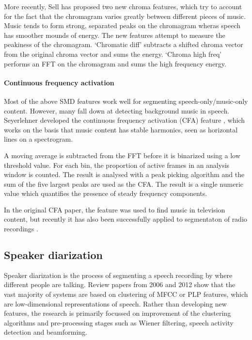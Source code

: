 More recently, Sell \citep{Sell2014} has proposed two new chroma features, which
try to account for the fact that the chromagram varies greatly between
different pieces of music. Music tends to form strong, separated peaks on the
chromagram wheras speech has smoother mounds of energy. The new features
attempt to measure the peakiness of the chromagram. `Chromatic diff' subtracts
a shifted chroma vector from the original chroma vector and sums the energy. 
`Chroma high freq' performs an FFT on the chromagram and sums the high
frequency energy.

\paragraph{Continuous frequency activation}
Most of the above SMD features work well for segmenting speech-only/music-only
content. However, many fall down at detecting background music in speech.
Seyerlehner developed the continuous frequency activation (CFA) feature
\citep{Seyerlehner2007}, which works on the basis that music content has stable
harmonics, seen as horizontal lines on a spectrogram.

A moving average is subtracted from the FFT before it is binarized using a low
threshold value. For each bin, the proportion of active frames in an analysis
window is counted. The result is analysed with a peak picking algorithm and the
sum of the five largest peaks are used as the CFA. The result is a single
numeric value which quantifies the presence of steady frequency components.

In the original CFA paper, the feature was used to find music in television
content, but recently it has also been successfully applied to segmentaton of
radio recordings \citep{Wieser2014}.

\subsection{Speaker diarization}
Speaker diarization is the process of segmenting a speech recording by where
different people are talking. Review papers from 2006 \citep{Tranter2006} and
2012 \citep{AngueraMiro2012} show that the vast majority of systems are based on
clustering of MFCC or PLP features, which are low-dimensional representations
of speech. Rather than developing new features, the research is primarily
focussed on improvement of the clustering algorithms and pre-processing stages
such as Wiener filtering, speech activity detection and beamforming.

